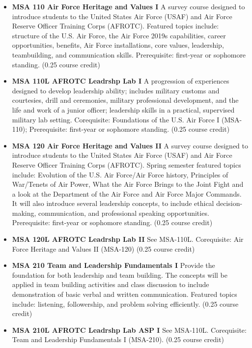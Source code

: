 \documentclass[
  letterpaper,
]{scrbook}
\providecommand{\tightlist}{%
  \setlength{\itemsep}{0pt}\setlength{\parskip}{0pt}}
\begin{document}
\begin{itemize}
\tightlist
\item
  \textbf{MSA 110 Air Force Heritage and Values I} A survey course
  designed to introduce students to the United States Air Force (USAF)
  and Air Force Reserve Officer Training Corps (AFROTC). Featured topics
  include: structure of the U.S. Air Force, the Air Force 2019s
  capabilities, career opportunities, benefits, Air Force installations,
  core values, leadership, teambuilding, and communication skills.
  Prerequisite: first-year or sophomore standing. (0.25 course credit)\\
\item
  \textbf{MSA 110L AFROTC Leadrshp Lab I} A progression of experiences
  designed to develop leadership ability; includes military customs and
  courtesies, drill and ceremonies, military professional development,
  and the life and work of a junior officer; leadership skills in a
  practical, supervised military lab setting. Corequisite: Foundations
  of the U.S. Air Force I (MSA-110); Prerequisite: first-year or
  sophomore standing. (0.25 course credit)
\item
  \textbf{MSA 120 Air Force Heritage and Values II} A survey course
  designed to introduce students to the United States Air Force (USAF)
  and Air Force Reserve Officer Training Corps (AFROTC). Spring semester
  featured topics include: Evolution of the U.S. Air Force/Air Force
  history, Principles of War/Tenets of Air Power, What the Air Force
  Brings to the Joint Fight and a look at the Department of the Air
  Force and Air Force Major Commands. It will also introduce several
  leadership concepts, to include ethical decision-making,
  communication, and professional speaking opportunities. Prerequisite:
  first-year or sophomore standing. (0.25 course credit)
\item
  \textbf{MSA 120L AFROTC Leadrshp Lab II} See MSA-110L. Corequisite:
  Air Force Heritage and Values II (MSA-120) (0.25 course credit)
\item
  \textbf{MSA 210 Team and Leadership Fundamentals I} Provide the
  foundation for both leadership and team building. The concepts will be
  applied in team building activities and class discussion to include
  demonstration of basic verbal and written communication. Featured
  topics include: listening, followership, and problem solving
  efficiently. (0.25 course credit)
\item
  \textbf{MSA 210L AFROTC Leadrshp Lab ASP I} See MSA-110L. Corequisite:
  Team and Leadership Fundamentals I (MSA-210). (0.25 course credit)

\end{itemize}
\end{document}
